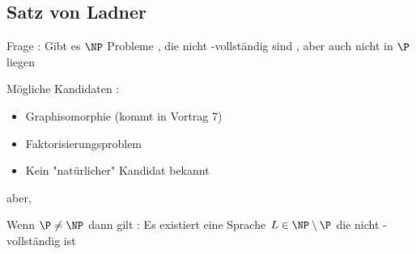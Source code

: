 \subsection[Satz von Ladner]{Satz von Ladner}

\begin{frame}
	Frage : Gibt es $\NP$  Probleme , die nicht \NP -vollständig sind , aber auch nicht in $\P$  liegen
\end{frame}
\begin{frame}
	Mögliche Kandidaten :
	\begin{itemize}
	\item Graphisomorphie (kommt in Vortrag 7)
	\item Faktorisierungsproblem
	\item Kein "natürlicher" Kandidat bekannt
	\end{itemize}
	
	aber,
\end{frame}

\begin{frame}
	\begin{Satz}
	Wenn $\P \neq \NP$ dann gilt : \newline
	Es existiert eine Sprache $L \in \NP \setminus \P$ die nicht \NP -vollständig ist
	\end{Satz}
\end{frame}